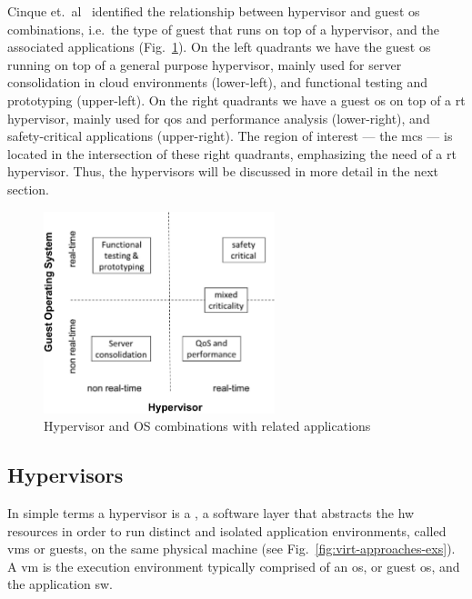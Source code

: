 Cinque et.~al~\cite{cinque2022virtualizing} identified the relationship between hypervisor and guest
\gls{os} combinations, i.e.~the type of guest that runs on top of a hypervisor, and the
associated applications (Fig.~\ref{fig:virt-combos}).
On the left quadrants we have the guest \gls{os} running on top of a general
purpose hypervisor, mainly used for server consolidation in cloud environments
(lower-left), and functional testing and prototyping (upper-left).
On the right quadrants we have a guest \gls{os} on top of a \gls{rt} hypervisor,
mainly used for \gls{qos} and performance analysis (lower-right), and
safety-critical applications (upper-right). The region of interest --- the
\gls{mcs} --- is located in the intersection of these right quadrants,
emphasizing the need of a \gls{rt} hypervisor. Thus, the hypervisors will be
discussed in more detail in the next section.

\begin{figure}[!hbt]
  \centering
  \includegraphics[width=0.6\textwidth]{./img/jpg/virt-combos} 
%   
  \caption[Hypervisor and OS combinations with related applications]{Hypervisor
    and OS combinations with related applications~\cite{cinque2022virtualizing}\footnotemark}%
  \label{fig:virt-combos}
\end{figure}
%
%

\subsection{Hypervisors}%
\label{sec:superv--hyperv}
In simple terms a hypervisor is a , a software layer that
abstracts the \gls{hw} resources in order to run distinct and isolated
application environments, called \glspl{vm} or guests, on the same physical
machine (see Fig.~\ref{fig:virt-approaches-exs}). A \gls{vm} is the execution environment typically comprised of an
\gls{os}, or guest \gls{os}, and the application \gls{sw}.

